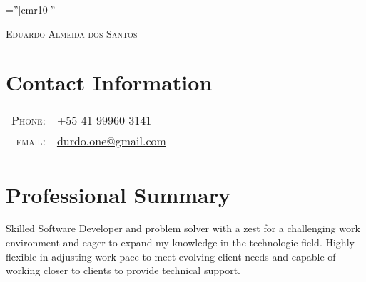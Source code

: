 \documentclass[a4paper,10pt]{article}
\begin{document}
\pagestyle{empty} %

\font\fb=''[cmr10]'' %


\par
{\centering
    {\Huge \textsc{Eduardo Almeida dos Santos}
}\bigskip\par}


\section{Contact Information}

\begin{tabular}{rl}


    \textsc{Phone:}
    & +55 41 99960-3141 \\

    \textsc{email:}
    & \href{mailto:durdo.one@gmail.com}{durdo.one@gmail.com}
\end{tabular}


\section{Professional Summary}
    Skilled Software Developer and problem solver with a zest for a challenging
    work environment and eager to expand my knowledge in the technologic field.
    Highly flexible in adjusting work pace to meet evolving client needs and
    capable of working closer to clients to provide technical support.

\end{document}

